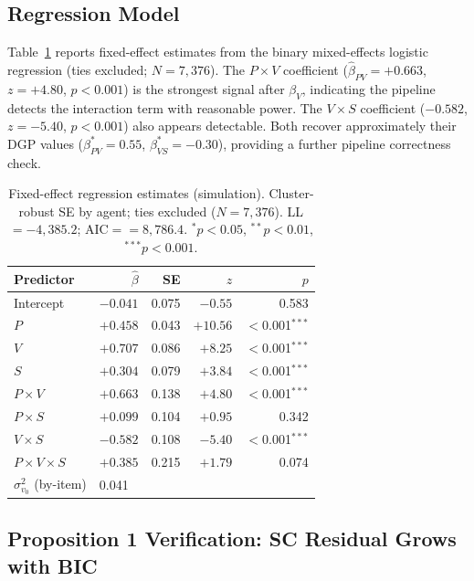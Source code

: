 \documentclass[10pt,conference]{IEEEtran}
\begin{document}
\subsection{Regression Model}

Table~\ref{tab:reg} reports fixed-effect estimates from
the binary mixed-effects logistic regression
(ties excluded; $N{=}7{,}376$).
The $P{\times}V$ coefficient ($\hat\beta_{PV}{=}{+}0.663$,
$z{=}{+}4.80$, $p{<}0.001$) is the strongest signal
after $\beta_V$, indicating the pipeline detects the
interaction term with reasonable power.
The $V{\times}S$ coefficient ($-0.582$, $z{=}{-5.40}$,
$p{<}0.001$) also appears detectable.
Both recover approximately their DGP values
($\beta_{PV}^*{=}0.55$, $\beta_{VS}^*{=}{-0.30}$),
providing a further pipeline correctness check.

\begin{table}[htbp]
\centering
\caption{Fixed-effect regression estimates (simulation).
Cluster-robust SE by agent; ties excluded ($N{=}7{,}376$).
LL$={-}4{,}385.2$; AIC$={=}8{,}786.4$.
${}^*p{<}0.05$, ${}^{**}p{<}0.01$, ${}^{***}p{<}0.001$.}
\label{tab:reg}
\small
\setlength{\tabcolsep}{5pt}
\begin{tabular}{lrrrr}
\toprule
\textbf{Predictor} & $\hat\beta$ & SE & $z$ & $p$ \\
\midrule
Intercept              & $-0.041$ & 0.075 & $-0.55$ & 0.583 \\
$P$                    & $+0.458$ & 0.043 & $+10.56$& $<$0.001$^{***}$ \\
$V$                    & $+0.707$ & 0.086 & $+8.25$ & $<$0.001$^{***}$ \\
$S$                    & $+0.304$ & 0.079 & $+3.84$ & $<$0.001$^{***}$ \\
$P{\times}V$           & $+0.663$ & 0.138 & $+4.80$ & $<$0.001$^{***}$ \\
$P{\times}S$           & $+0.099$ & 0.104 & $+0.95$ & 0.342 \\
$V{\times}S$           & $-0.582$ & 0.108 & $-5.40$ & $<$0.001$^{***}$ \\
$P{\times}V{\times}S$  & $+0.385$ & 0.215 & $+1.79$ & 0.074 \\
\midrule
$\sigma^2_{v_0}$ (by-item) & \multicolumn{4}{l}{0.041} \\
\bottomrule
\end{tabular}
\end{table}

\subsection{Proposition 1 Verification: SC Residual Grows
with BIC}
\end{document}
